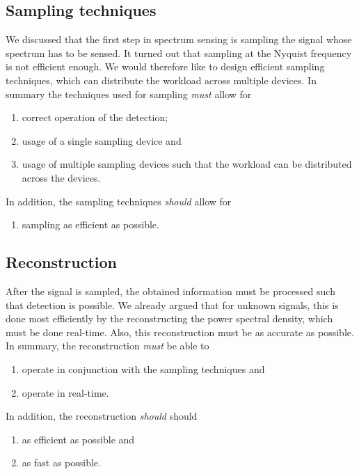 \documentclass[a4paper, openany, oneside]{memoir}
\begin{document}
\subsection{Sampling techniques}
We discussed that the first step in spectrum sensing is sampling the signal whose spectrum has to be sensed. It turned out that sampling at the Nyquist frequency is not efficient enough. We would therefore like to design efficient sampling techniques, which can distribute the workload across multiple devices. In summary the techniques used for sampling \emph{must} allow for
\begin{enumerate}
    \item correct operation of the detection;
    \item usage of a single sampling device and
    \item usage of multiple sampling devices such that the workload can be distributed across the devices.
\end{enumerate}
In addition, the sampling techniques \emph{should} allow for
\begin{enumerate}
    \item sampling as efficient as possible.
\end{enumerate}

\subsection{Reconstruction}
After the signal is sampled, the obtained information must be processed such that detection is possible. We already argued that for unknown signals, this is done most efficiently by the reconstructing the power spectral density, which must be done real-time. Also, this reconstruction must be as accurate as possible. In summary, the reconstruction \textit{must} be able to
\begin{enumerate}
    \item operate in conjunction with the sampling techniques and
    \item operate in real-time.
\end{enumerate}
In addition, the reconstruction \textit{should} should
\begin{enumerate}
    \item as efficient as possible and
    \item as fast as possible.
\end{enumerate}



\end{document}

